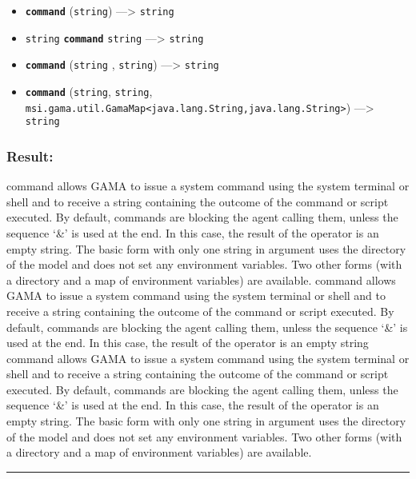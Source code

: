 \documentclass[]{book}
\providecommand{\tightlist}{%
  \setlength{\itemsep}{0pt}\setlength{\parskip}{0pt}}
\theoremstyle{definition}
\theoremstyle{definition}
\theoremstyle{definition}
\theoremstyle{remark}
\begin{document}
\begin{itemize}
\tightlist
\item
  \textbf{\texttt{command}} (\texttt{string}) ---\textgreater{}
  \texttt{string}
\item
  \texttt{string} \textbf{\texttt{command}} \texttt{string}
  ---\textgreater{} \texttt{string}
\item
  \textbf{\texttt{command}} (\texttt{string} , \texttt{string})
  ---\textgreater{} \texttt{string}
\item
  \textbf{\texttt{command}} (\texttt{string}, \texttt{string},
  \texttt{msi.gama.util.GamaMap\textless{}java.lang.String,java.lang.String\textgreater{}})
  ---\textgreater{} \texttt{string}
\end{itemize}

\subsubsection{Result:}\label{result-91}

command allows GAMA to issue a system command using the system terminal
or shell and to receive a string containing the outcome of the command
or script executed. By default, commands are blocking the agent calling
them, unless the sequence `\&' is used at the end. In this case, the
result of the operator is an empty string. The basic form with only one
string in argument uses the directory of the model and does not set any
environment variables. Two other forms (with a directory and a map of
environment variables) are available. command allows GAMA to issue a
system command using the system terminal or shell and to receive a
string containing the outcome of the command or script executed. By
default, commands are blocking the agent calling them, unless the
sequence `\&' is used at the end. In this case, the result of the
operator is an empty string command allows GAMA to issue a system
command using the system terminal or shell and to receive a string
containing the outcome of the command or script executed. By default,
commands are blocking the agent calling them, unless the sequence `\&'
is used at the end. In this case, the result of the operator is an empty
string. The basic form with only one string in argument uses the
directory of the model and does not set any environment variables. Two
other forms (with a directory and a map of environment variables) are
available.

\begin{center}\rule{0.5\linewidth}{\linethickness}\end{center}
\end{document}
